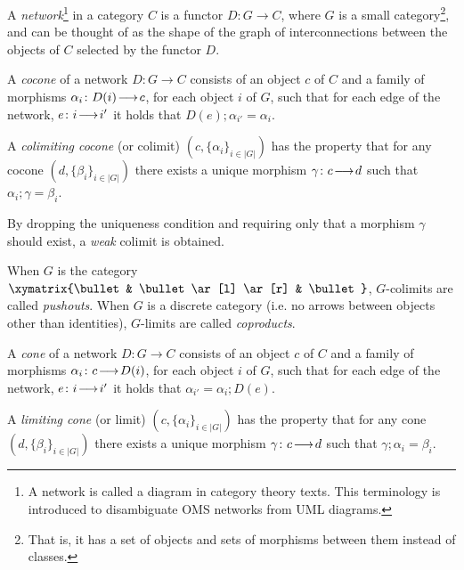 \documentclass[10pt, a4paper]{isov2}
\begin{document}

\label{sec:colimits}

\begin{definition}
A \emph{network}\footnote{A network is called a diagram in category theory texts. This terminology is introduced to disambiguate OMS networks
from UML diagrams.} in a category $C$ is 
a functor $D:G\to C$, where $G$ is a small category\footnote{That is, it has a set of objects and sets of morphisms between them
instead of classes.}, and can be thought of as the shape of the graph of
interconnections between the objects of $C$ selected by the functor $D$. 
\end{definition}

\begin{definition}
A \emph{cocone} of
a network $D:G\to C$ consists of an object $c$ of $C$ and a family of
morphisms $\alpha_i\colon D(i)\!\longrightarrow\!c$, for each object $i$ of $G$, such that for
each edge of the network, $e\colon i\!\longrightarrow\!i'$  it holds that 
$D(e);\alpha_{i'} = \alpha_{i}$. 
\end{definition}

\begin{definition}
A \emph{colimiting cocone} (or colimit) $(c, \{\alpha_i\}_{i\in|G|})$ 
has the property that for any 
cocone $(d, \{\beta_i\}_{i\in |G|})$ there exists a unique morphism 
$\gamma\colon c\!\longrightarrow\!d$ such that $\alpha_i;\gamma = \beta_i$.
 \end{definition}
  By dropping the 
uniqueness condition and requiring only that a morphism $\gamma$ should exist,
 a \emph{weak} colimit is obtained. 

When $G$ is the category $\xymatrix{\bullet & \bullet \ar[l] \ar[r]
& \bullet }$, $G$-colimits are
called  \emph{pushouts}. 
When $G$ is a discrete category (i.e. no arrows between objects other than identities),
 $G$-limits are called \emph{coproducts}.

\begin{definition}
A \emph{cone} of
a network $D:G\to C$ consists of an object $c$ of $C$ and a family of
morphisms $\alpha_i\colon c\!\longrightarrow\!D(i)$, for each object $i$ of $G$, such that for
each edge of the network, $e\colon i\!\longrightarrow\!i'$  it holds that 
$\alpha_{i'} = \alpha_{i};D(e)$. 
\end{definition} 

\begin{definition}
A \emph{limiting cone} (or limit) $(c, \{\alpha_i\}_{i\in|G|})$ 
has the property that for any 
cone $(d, \{\beta_i\}_{i\in |G|})$ there exists a unique morphism 
$\gamma\colon c\!\longrightarrow\!d$ such that $\gamma;\alpha_i = \beta_i$.
 \end{definition}
 
\end{document}
